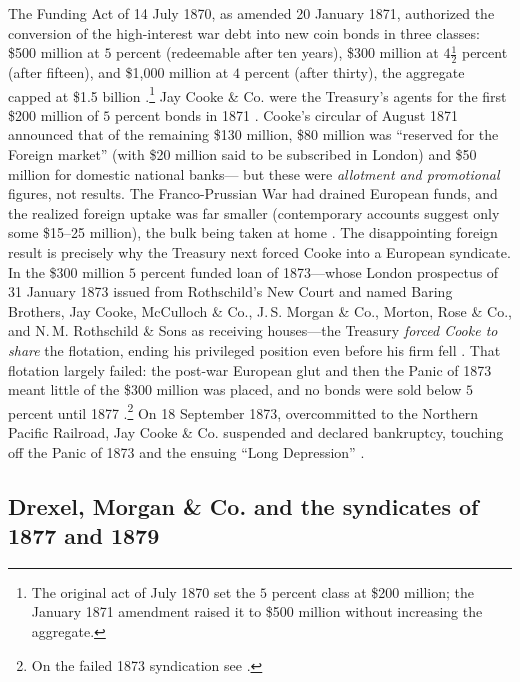 \documentclass[12pt]{article}
\begin{document}
The Funding Act of 14 July 1870, as amended 20 January 1871, authorized the
conversion of the high-interest war debt into new coin bonds in three classes:
\$500 million at $5$ percent (redeemable after ten years), \$300 million at
$4\tfrac{1}{2}$ percent (after fifteen), and \$1{,}000 million at $4$ percent
(after thirty), the aggregate capped at \$1.5 billion
\citep[477--478]{morgan1885}.\footnote{The original act of
July 1870 set the $5$ percent class at \$200 million; the January 1871 amendment
raised it to \$500 million without increasing the aggregate.} Jay Cooke \& Co.
were the Treasury's agents for the first \$200 million of $5$ percent bonds in
1871 \citep[315--330]{larson1936jaycooke}. Cooke's circular of August 1871
announced that of the remaining \$130
million, \$80 million was ``reserved for the Foreign market'' (with \$20 million
said to be subscribed in London) and \$50 million for domestic national banks---
but these were \emph{allotment and promotional} figures, not results. The
Franco-Prussian War had drained European funds, and the realized foreign uptake
was far smaller (contemporary accounts suggest only some \$15--25 million), the
bulk being taken at home \citep{dewey1903financial}. The disappointing foreign
result is precisely why the Treasury next forced Cooke into a European syndicate.
In the \$300 million $5$ percent funded loan of 1873---whose London prospectus of
31 January 1873 issued from Rothschild's New Court and named Baring Brothers,
Jay Cooke, McCulloch \& Co., J.\,S. Morgan \& Co., Morton, Rose \& Co., and
N.\,M. Rothschild \& Sons as receiving houses---the Treasury \emph{forced Cooke
to share} the flotation, ending his privileged position even before his firm fell
\citep[36]{chernow1990house}. That flotation largely failed: the post-war
European glut and then the Panic of 1873 meant little of the \$300 million was
placed, and no bonds were sold below $5$ percent until 1877
\citep[356]{dewey1903financial}.\footnote{On the failed 1873 syndication see
\citet[394--402]{larson1936jaycooke}.} On 18 September 1873,
overcommitted to the Northern Pacific Railroad, Jay Cooke \& Co. suspended and
declared bankruptcy, touching off the Panic of 1873 and the ensuing ``Long
Depression'' \citep[409--416]{larson1936jaycooke}.

\subsection{Drexel, Morgan \& Co. and the syndicates of 1877 and 1879}
\end{document}
